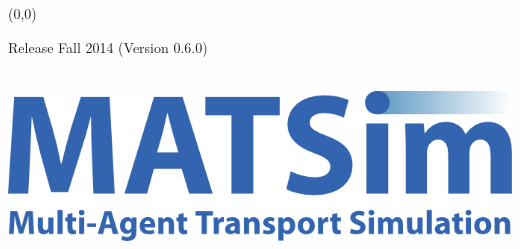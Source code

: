 \begin{titlepage}
\makeatletter
\pagestyle{empty}


\makebox(0,0){} %
\vspace{3cm}
\par
\raggedright
{\textcolor{Medium}{\fontsize{45}{60}\sffamily\bfseries \@title}}\par
\vspace{1cm}
{\textcolor{Medium}{\titleFontSmall Release Fall 2014 (Version 0.6.0)}}\par
\vspace{15cm}
{\titleFontSmall \mdseries\par\@author}\\
\vspace{2cm}
\raggedleft
\includegraphics[width=.33\textwidth]{figures/MATSimLogo_blue.png}

\makeatother
\end{titlepage}